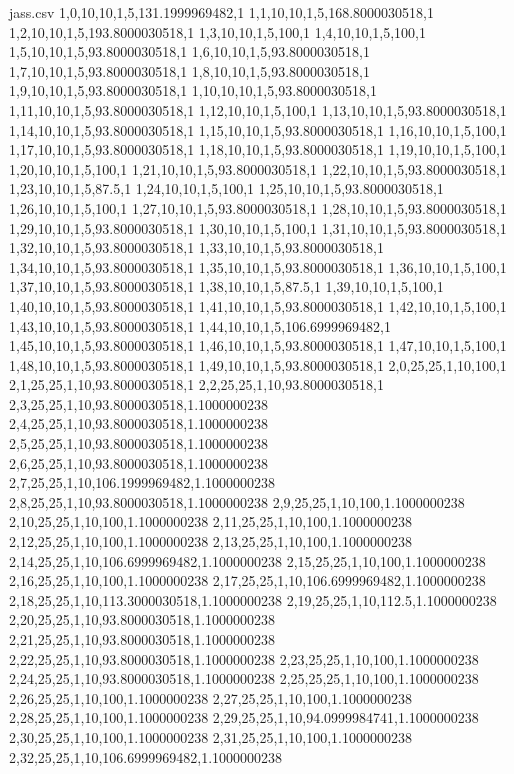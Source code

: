 \begin{filecontents*}{jass.csv}
1,0,10,10,1,5,131.1999969482,1
1,1,10,10,1,5,168.8000030518,1
1,2,10,10,1,5,193.8000030518,1
1,3,10,10,1,5,100,1
1,4,10,10,1,5,100,1
1,5,10,10,1,5,93.8000030518,1
1,6,10,10,1,5,93.8000030518,1
1,7,10,10,1,5,93.8000030518,1
1,8,10,10,1,5,93.8000030518,1
1,9,10,10,1,5,93.8000030518,1
1,10,10,10,1,5,93.8000030518,1
1,11,10,10,1,5,93.8000030518,1
1,12,10,10,1,5,100,1
1,13,10,10,1,5,93.8000030518,1
1,14,10,10,1,5,93.8000030518,1
1,15,10,10,1,5,93.8000030518,1
1,16,10,10,1,5,100,1
1,17,10,10,1,5,93.8000030518,1
1,18,10,10,1,5,93.8000030518,1
1,19,10,10,1,5,100,1
1,20,10,10,1,5,100,1
1,21,10,10,1,5,93.8000030518,1
1,22,10,10,1,5,93.8000030518,1
1,23,10,10,1,5,87.5,1
1,24,10,10,1,5,100,1
1,25,10,10,1,5,93.8000030518,1
1,26,10,10,1,5,100,1
1,27,10,10,1,5,93.8000030518,1
1,28,10,10,1,5,93.8000030518,1
1,29,10,10,1,5,93.8000030518,1
1,30,10,10,1,5,100,1
1,31,10,10,1,5,93.8000030518,1
1,32,10,10,1,5,93.8000030518,1
1,33,10,10,1,5,93.8000030518,1
1,34,10,10,1,5,93.8000030518,1
1,35,10,10,1,5,93.8000030518,1
1,36,10,10,1,5,100,1
1,37,10,10,1,5,93.8000030518,1
1,38,10,10,1,5,87.5,1
1,39,10,10,1,5,100,1
1,40,10,10,1,5,93.8000030518,1
1,41,10,10,1,5,93.8000030518,1
1,42,10,10,1,5,100,1
1,43,10,10,1,5,93.8000030518,1
1,44,10,10,1,5,106.6999969482,1
1,45,10,10,1,5,93.8000030518,1
1,46,10,10,1,5,93.8000030518,1
1,47,10,10,1,5,100,1
1,48,10,10,1,5,93.8000030518,1
1,49,10,10,1,5,93.8000030518,1
2,0,25,25,1,10,100,1
2,1,25,25,1,10,93.8000030518,1
2,2,25,25,1,10,93.8000030518,1
2,3,25,25,1,10,93.8000030518,1.1000000238
2,4,25,25,1,10,93.8000030518,1.1000000238
2,5,25,25,1,10,93.8000030518,1.1000000238
2,6,25,25,1,10,93.8000030518,1.1000000238
2,7,25,25,1,10,106.1999969482,1.1000000238
2,8,25,25,1,10,93.8000030518,1.1000000238
2,9,25,25,1,10,100,1.1000000238
2,10,25,25,1,10,100,1.1000000238
2,11,25,25,1,10,100,1.1000000238
2,12,25,25,1,10,100,1.1000000238
2,13,25,25,1,10,100,1.1000000238
2,14,25,25,1,10,106.6999969482,1.1000000238
2,15,25,25,1,10,100,1.1000000238
2,16,25,25,1,10,100,1.1000000238
2,17,25,25,1,10,106.6999969482,1.1000000238
2,18,25,25,1,10,113.3000030518,1.1000000238
2,19,25,25,1,10,112.5,1.1000000238
2,20,25,25,1,10,93.8000030518,1.1000000238
2,21,25,25,1,10,93.8000030518,1.1000000238
2,22,25,25,1,10,93.8000030518,1.1000000238
2,23,25,25,1,10,100,1.1000000238
2,24,25,25,1,10,93.8000030518,1.1000000238
2,25,25,25,1,10,100,1.1000000238
2,26,25,25,1,10,100,1.1000000238
2,27,25,25,1,10,100,1.1000000238
2,28,25,25,1,10,100,1.1000000238
2,29,25,25,1,10,94.0999984741,1.1000000238
2,30,25,25,1,10,100,1.1000000238
2,31,25,25,1,10,100,1.1000000238
2,32,25,25,1,10,106.6999969482,1.1000000238

\end{filecontents*}
